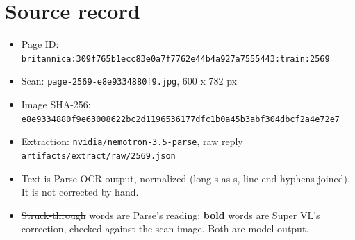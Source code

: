 \documentclass[10pt]{article}
\begin{document}
\section*{Source record}
\begin{itemize}
\item Page ID: \texttt{britannica:309f765b1ecc83e0a7f7762e44b4a927a7555443:train:2569}
\item Scan: \texttt{page-2569-e8e9334880f9.jpg}, 600 x 782 px
\item Image SHA-256: \texttt{\small e8e9334880f9e63008622bc2d1196536177dfc1b0a45b3abf304dbcf2a4e72e7}
\item Extraction: \texttt{nvidia/nemotron-3.5-parse}, raw reply \texttt{artifacts/extract/raw/2569.json}
\item Text is Parse OCR output, normalized (long s as s, line-end hyphens joined). It is not corrected by hand.
\item \sout{Struck-through} words are Parse's reading; \textbf{bold} words are Super VL's correction, checked against the scan image. Both are model output.
\end{itemize}
\end{document}
